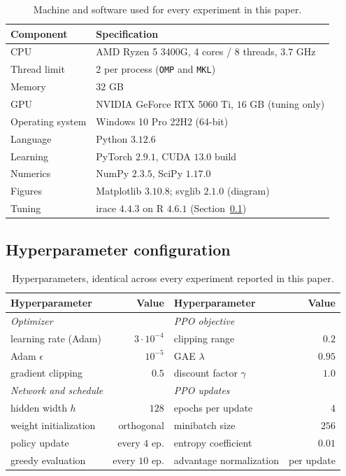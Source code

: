 \documentclass[preprint,authoryear,12pt]{elsarticle}
\theoremstyle{definition}
\theoremstyle{remark}
\begin{document}
\begin{table}[t]
\centering\small
\caption{Machine and software used for every experiment in this paper.}
\label{tab:environment}
\setlength{\tabcolsep}{4pt}
\begin{tabular}{ll}
\toprule
Component & Specification \\
\midrule
CPU & AMD Ryzen 5 3400G, 4 cores / 8 threads, $3.7$ GHz \\
Thread limit & 2 per process (\texttt{OMP} and \texttt{MKL}) \\
Memory & $32$ GB \\
GPU & NVIDIA GeForce RTX 5060 Ti, $16$ GB (tuning only) \\
Operating system & Windows 10 Pro 22H2 (64-bit) \\
\addlinespace
Language & Python $3.12.6$ \\
Learning & PyTorch $2.9.1$, CUDA $13.0$ build \\
Numerics & NumPy $2.3.5$, SciPy $1.17.0$ \\
Figures & Matplotlib $3.10.8$; svglib $2.1.0$ (diagram) \\
Tuning & irace $4.4.3$ on R $4.6.1$ (Section~\ref{sec:hyperconfig}) \\
\bottomrule
\end{tabular}
\end{table}

\subsection{Hyperparameter configuration}
\label{sec:hyperconfig}

\begin{table}[t]
\centering\small
\caption{Hyperparameters, identical across every experiment reported
in this paper.}
\label{tab:hyper}
\setlength{\tabcolsep}{4pt}
\begin{tabular}{lr@{\hskip 1.3em}|@{\hskip 1.3em}lr}
\toprule
Hyperparameter & Value & Hyperparameter & Value \\
\midrule
\textit{Optimizer} & & \textit{PPO objective} & \\
\quad learning rate (Adam) & $3\cdot10^{-4}$ &
  \quad clipping range & $0.2$ \\
\quad Adam $\epsilon$ & $10^{-5}$ &
  \quad GAE $\lambda$ & $0.95$ \\
\quad gradient clipping & $0.5$ &
  \quad discount factor $\gamma$ & $1.0$ \\
\addlinespace
\textit{Network and schedule} & & \textit{PPO updates} & \\
\quad hidden width $h$ & $128$ &
  \quad epochs per update & $4$ \\
\quad weight initialization & orthogonal &
  \quad minibatch size & $256$ \\
\quad policy update & every $4$ ep. &
  \quad entropy coefficient & $0.01$ \\
\quad greedy evaluation & every $10$ ep. &
  \quad advantage normalization & per update \\
\bottomrule
\end{tabular}
\end{table}
\end{document}
